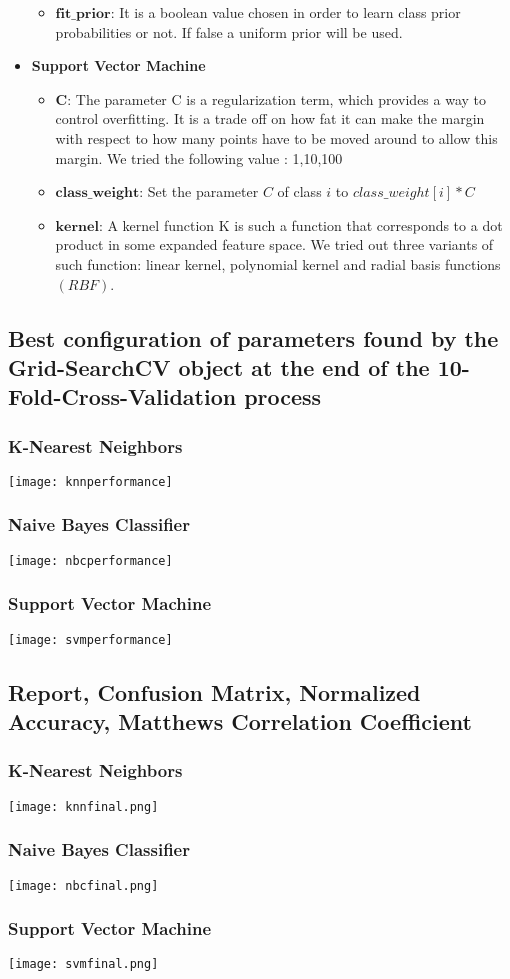\documentclass[11pt]{article}
\begin{document}
\begin{itemize}
\begin{itemize}
		\item{$\textbf{fit\_prior:}$} It is a boolean value chosen in order to learn class prior probabilities or not. If false a uniform prior will be used. 
	\end{itemize}


\item{\textbf{Support Vector Machine}}

	\begin{itemize}
		\item{$\textbf{C:}$} The parameter C is a regularization term, which provides a way to control overfitting. It is a trade off on how fat it can make the 			margin with respect to how many points have to be moved around to allow this margin. We tried the following value : 1,10,100

		\item{$\textbf{class\_weight:}$} Set the parameter $C$ of class $i$ to $class\_weight[i] * C$

		\item{$\textbf{kernel:}$} A kernel function K is such a function that corresponds to a dot product in some expanded feature space. We tried out three 			variants of such function: linear kernel, polynomial kernel and radial basis functions $(RBF)$. 	
	\end{itemize}
\end{itemize}

\subsection{Best configuration of parameters found by the Grid-SearchCV object at the end of the 10-Fold-Cross-Validation process}
\subsubsection{K-Nearest Neighbors}
\texttt{[image: knnperformance]}
\subsubsection{Naive Bayes Classifier}
\texttt{[image: nbcperformance]}
\subsubsection{Support Vector Machine}
\texttt{[image: svmperformance]}

\subsection{Report, Confusion Matrix, Normalized Accuracy, Matthews Correlation Coefficient}
\subsubsection{K-Nearest Neighbors}
\texttt{[image: knnfinal.png]}
\subsubsection{Naive Bayes Classifier}
\texttt{[image: nbcfinal.png]}
\subsubsection{Support Vector Machine}
\texttt{[image: svmfinal.png]}
\end{document}
